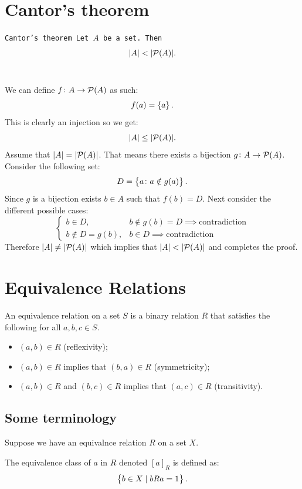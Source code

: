 \documentclass[11pt,a4paper]{article}
\begin{document}
	\section{Cantor's theorem}
  \begin{theorem}\tt{Cantor's theorem}
	Let $A$ be a set. Then
	\[
		|A| < |\mathcal{P}(A)|.
	\]
	\end{theorem}
	\noindent We can define $f \colon A \to \mathcal{P}(A)$ as such:
	\[
		f(a) = \left\{a\right\}.
	\]
	This is clearly an injection so we get:
	\[
		 |A| \le |\mathcal{P}(A)|.
	\]
	Assume that $|A| = |\mathcal{P}(A)|$. 
	That means there exists a bijection $g \colon A \to \mathcal{P}(A)$.
  Consider the following set:
	\[
		D = \left\{a \colon a \notin g(a)\right\}.
	\]
	Since $g$ is a bijection exists $b \in A$ such that $f(b) = D$.
  Next consider the different possible cases:
	\[
		\begin{cases}
		b\in D, & b\notin g(b)=D \implies \text{contradiction} \\
		b\notin D=g(b), & b\in D \implies \text{contradiction}
		\end{cases}
	\]
	Therefore $|A| \neq |\mathcal{P}(A)|$ which implies that 
  $|A| < |\mathcal{P}(A)|$ and completes the proof.
		
\newpage
	\section{Equivalence Relations}
  \begin{definition}
	An equivalence relation on a set $S$ is a binary relation $R$ that 
  satisfies the following for all $a,b,c \in S$.
	\begin{itemize}
	\item $(a,b) \in R$ (reflexivity);
	\item $(a,b) \in R$ implies that $(b,a) \in R$ (symmetricity);
	\item $(a,b) \in R$ and $(b,c) \in R$ implies that $(a,c) \in R$
    (transitivity).
	\end{itemize}
  \end{definition}
	
	\subsection{Some terminology}
		
    Suppose we have an equivalnce relation $R$ on a set $X$.

    \begin{definition}
			The equivalence class of $a$ in $R$ denoted $[a]_R$ is defined as:
			\[
        \left\{b \in X \mid bRa = 1\right\}.
			\]
		\end{definition}
\end{document}
